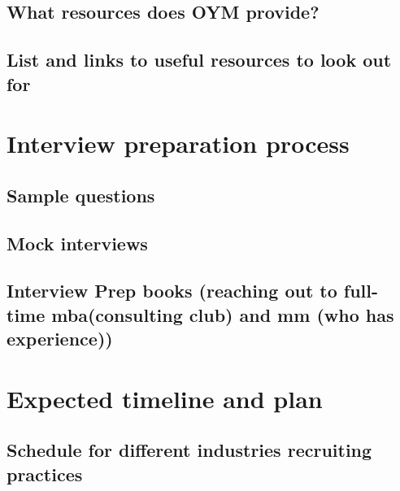 \documentclass[
]{book}
\begin{document}
\hypertarget{what-resources-does-oym-provide}{%
\subsection{What resources does OYM provide?}\label{what-resources-does-oym-provide}}

\hypertarget{list-and-links-to-useful-resources-to-look-out-for}{%
\subsection{List and links to useful resources to look out for}\label{list-and-links-to-useful-resources-to-look-out-for}}

\hypertarget{interview-preparation-process}{%
\section{Interview preparation process}\label{interview-preparation-process}}

\hypertarget{sample-questions}{%
\subsection{Sample questions}\label{sample-questions}}

\hypertarget{mock-interviews}{%
\subsection{Mock interviews}\label{mock-interviews}}

\hypertarget{interview-prep-books-reaching-out-to-full-time-mbaconsulting-club-and-mm-who-has-experience}{%
\subsection{Interview Prep books (reaching out to full-time mba(consulting club) and mm (who has experience))}\label{interview-prep-books-reaching-out-to-full-time-mbaconsulting-club-and-mm-who-has-experience}}

\hypertarget{expected-timeline-and-plan}{%
\section{Expected timeline and plan}\label{expected-timeline-and-plan}}

\hypertarget{schedule-for-different-industries-recruiting-practices}{%
\subsection{Schedule for different industries recruiting practices}\label{schedule-for-different-industries-recruiting-practices}}
\end{document}
